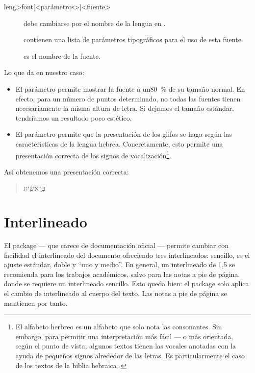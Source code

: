 \begin{latexcode}
\newfontfamily\<leng>font[<parámetros>]{<fuente>}
\end{latexcode}

\begin{description}
\item[]debe cambiarse por el nombre de la lengua en .
\item[]contienen una lista de parámetros tipográficos para el uso de esta fuente.
\item[]es el nombre de la fuente.
\end{description}

Lo que da en nuestro caso:
\begin{latexcode}
\newfontfamily{}
\end{latexcode}

\begin{itemize}
\item El parámetro  permite mostrar la fuente a un80~\% de su tamaño normal. En efecto, para un número de puntos determinado, no todas las fuentes tienen necesariamente la misma altura de letra. Si dejamos el tamaño estándar, tendríamos un resultado poco estético.
\item El parámetro  permite que la presentación de los glifos se haga según las características de la lengua hebrea. Concretamente, esto permite una presentación correcta de los signos de vocalización\footnote{El alfabeto herbreo es un alfabeto que solo nota las consonantes. Sin embargo, para permitir una interpretación más fácil --- o más orientada, según el punto de vista, algunos textos tienen las vocales anotadas con la ayuda de pequeños signos alrededor de las letras. Es particularmente el caso de los textos de la biblia hebraica \parencite[Voir][4-7]{Verheij2007}.}. 
\end{itemize}

Así obtenemos una presentación correcta:
\begin{quotation}
\texthebrew{בְּרֵאשִׁ֖ית}
\end{quotation}
\section{Interlineado}\label{interligne}

El package  --- que carece de documentación oficial --- permite cambiar con facilidad el interlineado del documento ofreciendo tres interlineados: sencillo, es el ajuste estándar, doble y \enquote{uno y medio}. En general, un interlineado de 1,5 se recomienda para los trabajos académicos, salvo para las notas a pie de página, donde se requiere un interlineado sencillo. Esto queda bien: el package solo aplica el cambio de interlineado al cuerpo del texto. Las notas a pie de página se mantienen por tanto.

